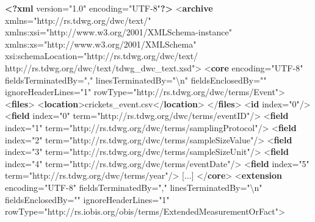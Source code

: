 \documentclass[
]{book}
\newenvironment{Shaded}{\begin{snugshade}}{\end{snugshade}}
\newcommand{\FunctionTok}[1]{\textcolor[rgb]{0.13,0.29,0.53}{\textbf{#1}}}
\newcommand{\KeywordTok}[1]{\textcolor[rgb]{0.13,0.29,0.53}{\textbf{#1}}}
\newcommand{\NormalTok}[1]{#1}
\newcommand{\OtherTok}[1]{\textcolor[rgb]{0.56,0.35,0.01}{#1}}
\newcommand{\StringTok}[1]{\textcolor[rgb]{0.31,0.60,0.02}{#1}}
\begin{document}
\begin{Shaded}
\begin{Highlighting}[]
\FunctionTok{\textless{}?xml}\OtherTok{ version=}\StringTok{"1.0"}\OtherTok{ encoding=}\StringTok{"UTF{-}8"}\FunctionTok{?\textgreater{}}
\NormalTok{\textless{}}\KeywordTok{archive}\OtherTok{ xmlns=}\StringTok{"http://rs.tdwg.org/dwc/text/"}\OtherTok{ xmlns:xsi=}\StringTok{"http://www.w3.org/2001/XMLSchema{-}instance"}\OtherTok{ xmlns:xs=}\StringTok{"http://www.w3.org/2001/XMLSchema"}\OtherTok{ xsi:schemaLocation=}\StringTok{"http://rs.tdwg.org/dwc/text/ http://rs.tdwg.org/dwc/text/tdwg\_dwc\_text.xsd"}\NormalTok{\textgreater{}}
\NormalTok{  \textless{}}\KeywordTok{core}\OtherTok{ encoding=}\StringTok{"UTF{-}8"}\OtherTok{ fieldsTerminatedBy=}\StringTok{","}\OtherTok{ linesTerminatedBy=}\StringTok{"\textbackslash{}n"}\OtherTok{ fieldsEnclosedBy=}\StringTok{""}\OtherTok{ ignoreHeaderLines=}\StringTok{"1"}\OtherTok{ rowType=}\StringTok{"http://rs.tdwg.org/dwc/terms/Event"}\NormalTok{\textgreater{}}
\NormalTok{    \textless{}}\KeywordTok{files}\NormalTok{\textgreater{}}
\NormalTok{      \textless{}}\KeywordTok{location}\NormalTok{\textgreater{}crickets\_event.csv\textless{}/}\KeywordTok{location}\NormalTok{\textgreater{}}
\NormalTok{    \textless{}/}\KeywordTok{files}\NormalTok{\textgreater{}}
\NormalTok{    \textless{}}\KeywordTok{id}\OtherTok{ index=}\StringTok{"0"}\NormalTok{/\textgreater{}}
\NormalTok{    \textless{}}\KeywordTok{field}\OtherTok{ index=}\StringTok{"0"}\OtherTok{ term=}\StringTok{"http://rs.tdwg.org/dwc/terms/eventID"}\NormalTok{/\textgreater{}}
\NormalTok{    \textless{}}\KeywordTok{field}\OtherTok{ index=}\StringTok{"1"}\OtherTok{ term=}\StringTok{"http://rs.tdwg.org/dwc/terms/samplingProtocol"}\NormalTok{/\textgreater{}}
\NormalTok{    \textless{}}\KeywordTok{field}\OtherTok{ index=}\StringTok{"2"}\OtherTok{ term=}\StringTok{"http://rs.tdwg.org/dwc/terms/sampleSizeValue"}\NormalTok{/\textgreater{}}
\NormalTok{    \textless{}}\KeywordTok{field}\OtherTok{ index=}\StringTok{"3"}\OtherTok{ term=}\StringTok{"http://rs.tdwg.org/dwc/terms/sampleSizeUnit"}\NormalTok{/\textgreater{}}
\NormalTok{    \textless{}}\KeywordTok{field}\OtherTok{ index=}\StringTok{"4"}\OtherTok{ term=}\StringTok{"http://rs.tdwg.org/dwc/terms/eventDate"}\NormalTok{/\textgreater{}}
\NormalTok{    \textless{}}\KeywordTok{field}\OtherTok{ index=}\StringTok{"5"}\OtherTok{ term=}\StringTok{"http://rs.tdwg.org/dwc/terms/year"}\NormalTok{/\textgreater{}}
\NormalTok{    [...]}
\NormalTok{  \textless{}/}\KeywordTok{core}\NormalTok{\textgreater{}}
\NormalTok{  \textless{}}\KeywordTok{extension}\OtherTok{ encoding=}\StringTok{"UTF{-}8"}\OtherTok{ fieldsTerminatedBy=}\StringTok{","}\OtherTok{ linesTerminatedBy=}\StringTok{"\textbackslash{}n"}\OtherTok{ fieldsEnclosedBy=}\StringTok{""}\OtherTok{ ignoreHeaderLines=}\StringTok{"1"}\OtherTok{ rowType=}\StringTok{"http://rs.iobis.org/obis/terms/ExtendedMeasurementOrFact"}\NormalTok{\textgreater{}}

\end{Highlighting}
\end{Shaded}
\end{document}
